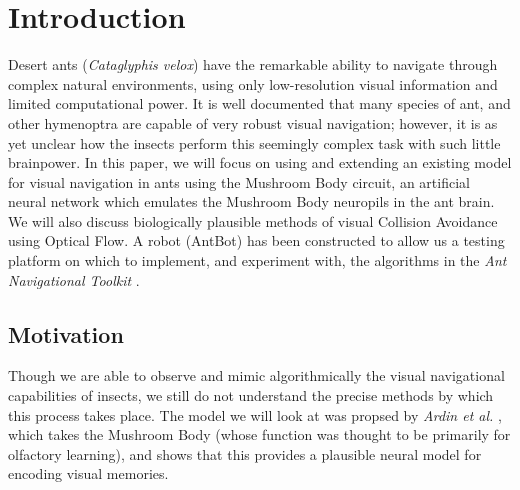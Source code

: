 \documentclass[a4paper,12pt]{article}
\begin{document}
\newpage


\tableofcontents

\newpage

\listoffigures
\newpage

\listoftables
\newpage

\raggedright
\section{ Introduction }
Desert ants (\textit{Cataglyphis velox}) have the
remarkable ability to navigate through complex natural environments, using only low-resolution
visual information and limited computational power. It is well documented that many species of
ant, and other hymenoptra are capable of very robust visual navigation; however, it is as yet
unclear how the insects perform this seemingly complex task with such little brainpower. In this
paper, we will focus on using and extending an existing model for visual navigation in ants using
the Mushroom Body circuit, an artificial neural network which emulates the Mushroom Body neuropils
in the ant brain. We will also discuss biologically plausible methods of visual Collision Avoidance
using Optical Flow. A robot (AntBot) has been constructed \cite{Eberding2016} to allow us a testing
platform on which to implement, and experiment with, the algorithms in the
\textit{Ant Navigational Toolkit} \cite{Wehner2009}.

\subsection{ Motivation }
Though we are able to observe and mimic algorithmically the visual navigational capabilities
of insects, we still do not understand the precise methods by which this process takes place. The
model we will look at was propsed by \textit{Ardin et al.} \cite{Ardin2016}, which takes
the Mushroom Body (whose function was thought to be primarily for olfactory learning), and shows
that this provides a plausible neural model for encoding visual memories.
\newline
\end{document}

